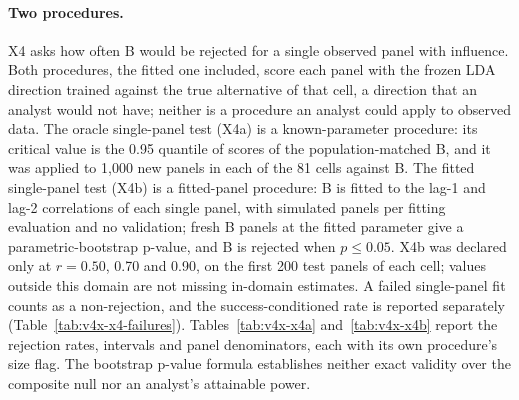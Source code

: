 \paragraph{Two procedures.}
X4 asks how often B would be rejected for a single observed panel with influence. Both procedures, the fitted one included, score each panel with the frozen LDA direction trained against the true alternative of that cell, a direction that an analyst would not have; neither is a procedure an analyst could apply to observed data. The oracle single-panel test (X4a) is a known-parameter procedure: its critical value is the 0.95 quantile of  scores of the population-matched B, and it was applied to 1,000 new panels in each of the 81 cells against B. The fitted single-panel test (X4b) is a fitted-panel procedure: B is fitted to the lag-1 and lag-2 correlations of each single panel, with  simulated panels per fitting evaluation and no validation;  fresh B panels at the fitted parameter give a parametric-bootstrap p-value, and B is rejected when $p\le0.05$. X4b was declared only at $r=0.50$, 0.70 and 0.90, on the first 200 test panels of each cell; values outside this domain are not missing in-domain estimates. A failed single-panel fit counts as a non-rejection, and the success-conditioned rate is reported separately (Table~\ref{tab:v4x-x4-failures}). Tables~\ref{tab:v4x-x4a} and~\ref{tab:v4x-x4b} report the rejection rates, intervals and panel denominators, each with its own procedure's size flag. The bootstrap p-value formula establishes neither exact validity over the composite null nor an analyst's attainable power.

